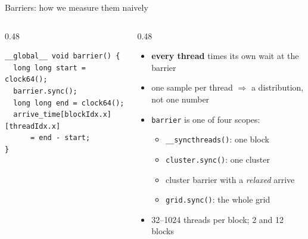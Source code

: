 \documentclass[aspectratio=169, numbering=fraction]{beamer}
\begin{document}
\begin{frame}[fragile]{Barriers: how we measure them naively}
  \vspace{0.4em}
  \footnotesize
  \begin{columns}[c,onlytextwidth]
    \begin{column}{0.48\textwidth}
\begin{verbatim}
__global__ void barrier() {
  long long start = clock64();
  barrier.sync();
  long long end = clock64();
  arrive_time[blockIdx.x][threadIdx.x]
      = end - start;
}
\end{verbatim}
    \end{column}
    \begin{column}{0.48\textwidth}
      \begin{itemize}\itemsep4pt
        \item \textbf{every thread} times its own wait at the barrier
        \item one sample per thread $\Rightarrow$ a distribution, not one number
        \item \texttt{barrier} is one of four scopes:
          \begin{itemize}\scriptsize\itemsep0pt
            \item \texttt{\_\_syncthreads()}: one block
            \item \texttt{cluster.sync()}: one cluster
            \item cluster barrier with a \emph{relaxed} arrive
            \item \texttt{grid.sync()}: the whole grid
          \end{itemize}
        \item 32--1024 threads per block; 2 and 12 blocks
      \end{itemize}
    \end{column}
  \end{columns}
\end{frame}
\end{document}
